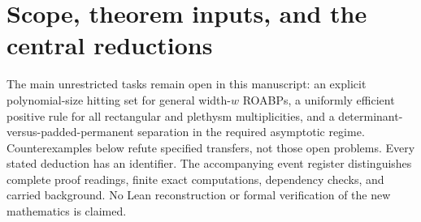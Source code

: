 \section{Scope, theorem inputs, and the central reductions}

The main unrestricted tasks remain open in this manuscript: an explicit polynomial-size hitting set for general width-$w$ ROABPs, a uniformly efficient positive rule for all rectangular and plethysm multiplicities, and a determinant-versus-padded-permanent separation in the required asymptotic regime. Counterexamples below refute specified transfers, not those open problems. Every stated deduction has an identifier. The accompanying event register distinguishes complete proof readings, finite exact computations, dependency checks, and carried background. No Lean reconstruction or formal verification of the new mathematics is claimed.

